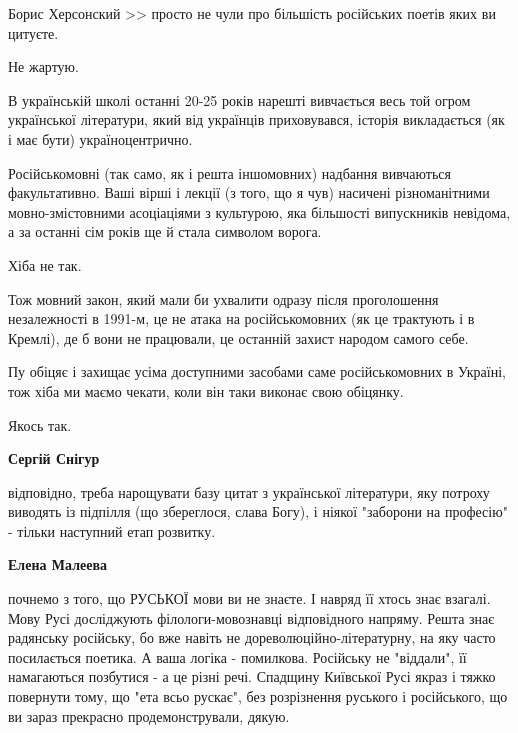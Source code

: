 \begin{itemize}
\begin{itemize}
 

Борис Херсонский >> просто не чули про більшість російських поетів яких ви цитуєте.

Не жартую.

В українській школі останні 20-25 років нарешті вивчається весь той огром
української літератури, який від українців приховувався, історія викладається
(як і має бути) україноцентрично.

Російськомовні (так само, як і решта іншомовних) надбання вивчаються
факультативно. Ваші вірші і лекції (з того, що я чув) насичені різноманітними
мовно-змістовними асоціаціями з культурою, яка більшості випускників невідома,
а за останні сім років ще й стала символом ворога.

Хіба не так.

Тож мовний закон, який мали би ухвалити одразу після проголошення незалежності
в 1991-м, це не атака на російськомовних (як це трактують і в Кремлі), де б
вони не працювали, це останній захист народом самого себе.

Пу обіцяє і захищає усіма доступними засобами саме російськомовних в Україні,
тож хіба ми маємо чекати, коли він таки виконає свою обіцянку.

Якось так.

 
\textbf{Сергій Снігур} 

відповідно, треба нарощувати базу цитат з української літератури, яку потроху
виводять із підпілля (що збереглося, слава Богу), і ніякої "заборони на
професію" - тільки наступний етап розвитку.


 
\textbf{Елена Малеева} 

почнемо з того, що РУСЬКОЇ мови ви не знаєте. І навряд її хтось знає взагалі.
Мову Русі досліджують філологи-мовознавці відповідного напряму. Решта знає
радянську російську, бо вже навіть не дореволюційно-літературну, на яку часто
посилається поетика. А ваша логіка - помилкова. Російську не "віддали", її
намагаються позбутися - а це різні речі. Спадщину Київської Русі якраз і тяжко
повернути тому, що "ета всьо рускає", без розрізнення руського і російського,
що ви зараз прекрасно продемонстрували, дякую.


\end{itemize}
\end{itemize}
